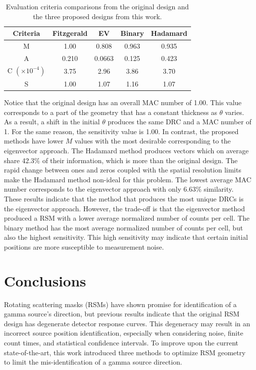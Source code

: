 \documentclass[3p,times]{elsarticle}
\begin{document}
\begin{table}[ht]
\caption{Evaluation criteria comparisons from the original design and the three proposed designs from this work.} %
\centering %
\begin{tabular}{|c|c|c|c|c|} %
\hline
Criteria & Fitzgerald & EV & Binary & Hadamard\\
\hline
M & 1.00 & 0.808 & 0.963 & 0.935\\
\hline
A & 0.210 & 0.0663 & 0.125 & 0.423 \\
\hline
C $\left(\times 10^{-4}\right)$ & 3.75 & 2.96 & 3.86 & 3.70\\
\hline
S & 1.00 & 1.07 & 1.16 & 1.07 \\
\hline
\end{tabular}
\label{table:results} %
\end{table}

Notice that the original design has an overall MAC number of 1.00. 
This value corresponds to a part of the geometry that has a constant thickness as $\theta$ varies.  
As a result, a shift in the initial $\theta$ produces the same DRC and a MAC number of 1.  
For the same reason, the sensitivity value is 1.00.  
In contrast, the proposed methods have lower $M$ values with the most desirable corresponding to the eigenvector approach.  
The Hadamard method produces vectors which on average share 42.3\% of their information, which is more than the original design.  
The rapid change between ones and zeros coupled with the spatial resolution limits make the Hadamard method non-ideal for this problem.  
The lowest average MAC number corresponds to the eigenvector approach with only 6.63\% similarity.  
These results indicate that the method that produces the most unique
DRCs is the eigenvector approach.  
However, the trade-off is that the eigenvector method produced a RSM with a lower average normalized number of counts per cell.  
The binary method has the most average normalized number of counts per cell, but also the highest sensitivity.  
This high sensitivity may indicate that certain initial positions are more susceptible to measurement noise.

\section{Conclusions}
Rotating scattering masks (RSMs) have shown promise for identification of a gamma source's direction, but previous results indicate that the original RSM design has degenerate detector response curves.  
This degeneracy may result in an incorrect source position identification, especially when considering noise, finite count times, and statistical confidence intervals.
To improve upon the current state-of-the-art, this work introduced three methods to optimize RSM geometry to limit the mis-identification of a gamma source direction.  
\end{document}
